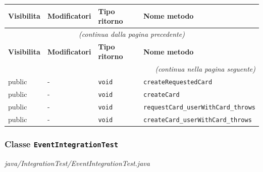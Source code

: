 \begin{longtable}{@{}llll@{}}
\toprule
\textbf{Visibilita} & \textbf{Modificatori} & \textbf{Tipo ritorno} & \textbf{Nome metodo} \\
\midrule
\endfirsthead
\multicolumn{4}{c}{\small\itshape (continua dalla pagina precedente)} \\
\toprule
\textbf{Visibilita} & \textbf{Modificatori} & \textbf{Tipo ritorno} & \textbf{Nome metodo} \\
\midrule
\endhead
\midrule
\multicolumn{4}{r}{\small\itshape (continua nella pagina seguente)} \\
\endfoot
\bottomrule
\endlastfoot
  public & - & \texttt{void} & \texttt{createRequestedCard} \\
  public & - & \texttt{void} & \texttt{createCard} \\
  public & - & \texttt{void} & \texttt{requestCard\_userWithCard\_throws} \\
  public & - & \texttt{void} & \texttt{createCard\_userWithCard\_throws} \\
\end{longtable}

\subsubsection*{Classe \texttt{EventIntegrationTest}}\label{EventIntegrationTest}
{\small\textit{java/IntegrationTest/EventIntegrationTest.java}}
\vspace{4pt}

